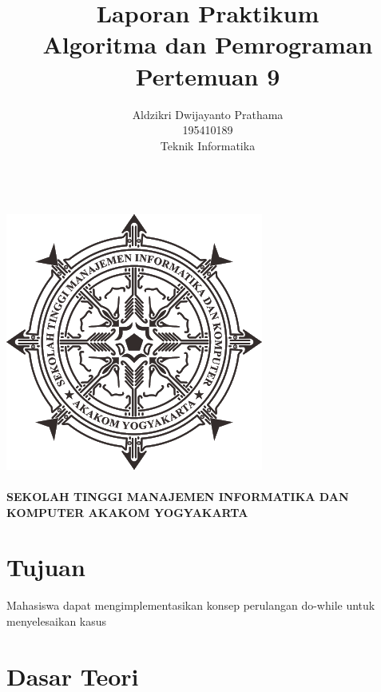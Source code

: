 \documentclass[a4paper,12pt]{article}
\begin{document}
\title{ {\Large Laporan Praktikum}\\ Algoritma dan Pemrograman \\{\Large Pertemuan 9}}

\author{Aldzikri Dwijayanto Prathama 
	\\195410189
	\\Teknik Informatika}
\makeatletter
\begin{titlepage}
	\begin{center}
		{\huge \bfseries \@title }\\[14ex]
		\includegraphics[scale=.8]{logo}\\[4ex]
		{\large \@author}\\[19ex]
		{\large \bfseries {SEKOLAH TINGGI MANAJEMEN INFORMATIKA DAN KOMPUTER
				AKAKOM YOGYAKARTA}}
	\end{center}


\end{titlepage}
\makeatother
\newpage
\tableofcontents
\newpage

\section{Tujuan}
Mahasiswa dapat mengimplementasikan konsep perulangan do-while untuk menyelesaikan kasus

\section{Dasar Teori}
\end{document}
